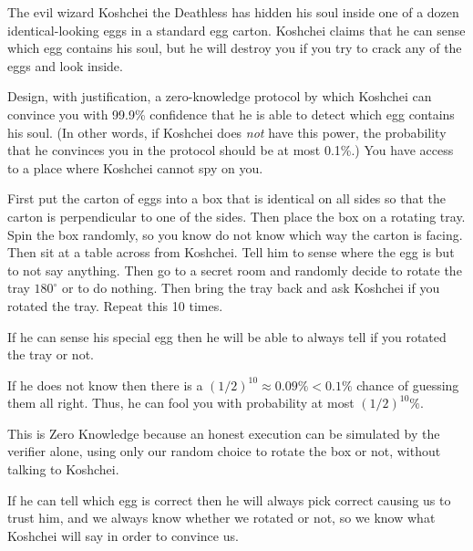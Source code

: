 \documentclass[12pt, letterpaper]{article}
\begin{document}
\begin{problem}{}
    The evil wizard Koshchei the Deathless has hidden his soul inside one of a dozen identical-looking eggs in a standard egg carton. Koshchei claims that he can sense which egg contains his soul, but he will destroy you if you try to crack any of the eggs and look inside.

    Design, with justification, a zero-knowledge protocol by which Koshchei can convince you with 99.9\% confidence that he is able to detect which egg contains his soul. (In other words, if Koshchei does \emph{not} have this power, the probability that he convinces you in the protocol should be at most 0.1\%.) You have access to a place where Koshchei cannot spy on you.
\end{problem}
\begin{problemproof}
    First put the carton of eggs into a box that is identical on all sides so that the carton is perpendicular to one of the sides. Then place the box on a rotating tray. Spin the box randomly, so you know do not know which way the carton is facing. Then sit at a table across from Koshchei. Tell him to sense where the egg is but to not say anything. Then go to a secret room and randomly decide to rotate the tray $180^{\circ}$ or to do nothing. Then bring the tray back and ask Koshchei if you rotated the tray. Repeat this 10 times.

    If he can sense his special egg then he will be able to always tell if you rotated the tray or not.

    If he does not know then there is a $(1/2)^{10} \approx 0.09\% < 0.1\%$ chance of guessing them all right. Thus, he can fool you with probability at most $(1/2)^{10} \%$.

    This is Zero Knowledge because an honest execution can be simulated by the verifier alone, using only our random choice to rotate the box or not, without talking to Koshchei.

    If he can tell which egg is correct then he will always pick correct causing us to trust him, and we always know whether we rotated or not, so we know what Koshchei will say in order to convince us.
\end{problemproof}
\end{document}
